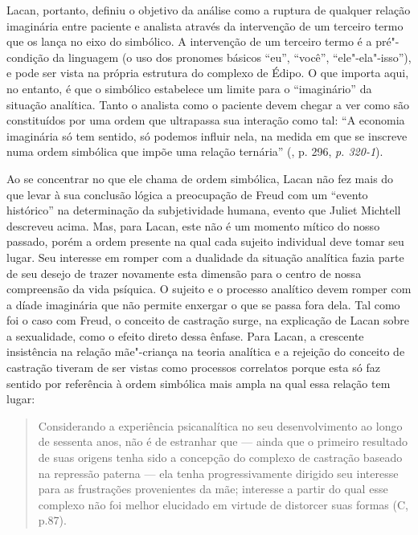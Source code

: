 Lacan, portanto, definiu o objetivo da análise como a ruptura de
qualquer relação imaginária entre paciente e analista através da
intervenção de um terceiro termo que os lança no eixo do simbólico. A
intervenção de um terceiro termo é a pré"-condição da linguagem (o uso
dos pronomes básicos ``eu'', ``você'', ``ele"-ela"-isso''), e pode ser
vista na própria estrutura do complexo de Édipo. O que importa aqui, no
entanto, é que o simbólico estabelece um limite para o ``imaginário'' da
situação analítica. Tanto o analista como o paciente devem chegar a ver
como são constituídos por uma ordem que ultrapassa sua interação como
tal: ``A economia imaginária só tem sentido, só podemos influir nela, na
medida em que se inscreve numa ordem simbólica que impõe uma relação
ternária'' (, p. 296, \emph{p. 320-1}).

Ao se concentrar no que ele chama de ordem simbólica, Lacan não fez mais
do que levar à sua conclusão lógica a preocupação de Freud com um
``evento histórico'' na determinação da subjetividade humana, evento que
Juliet Michtell descreveu acima. Mas, para Lacan, este não é um momento
mítico do nosso passado, porém a ordem presente na qual cada sujeito
individual deve tomar seu lugar. Seu interesse em romper com a dualidade
da situação analítica fazia parte de seu desejo de trazer novamente esta
dimensão para o centro de nossa compreensão da vida psíquica. O sujeito
e o processo analítico devem romper com a díade imaginária que não
permite enxergar o que se passa fora dela. Tal como foi o caso com
Freud, o conceito de castração surge, na explicação de Lacan sobre a
sexualidade, como o efeito direto dessa ênfase. Para Lacan, a crescente
insistência na relação mãe"-criança na teoria analítica e a rejeição do
conceito de castração tiveram de ser vistas como processos correlatos
porque esta só faz sentido por referência à ordem simbólica mais ampla
na qual essa relação tem lugar:

\begin{quote}
Considerando a experiência psicanalítica no seu desenvolvimento ao longo
de sessenta anos, não é de estranhar que --- ainda que o primeiro
resultado de suas origens tenha sido a concepção do complexo de
castração baseado na repressão paterna --- ela tenha progressivamente
dirigido seu interesse para as frustrações provenientes da mãe;
interesse a partir do qual esse complexo não foi melhor elucidado em
virtude de distorcer suas formas (C, p.87).
\end{quote}

